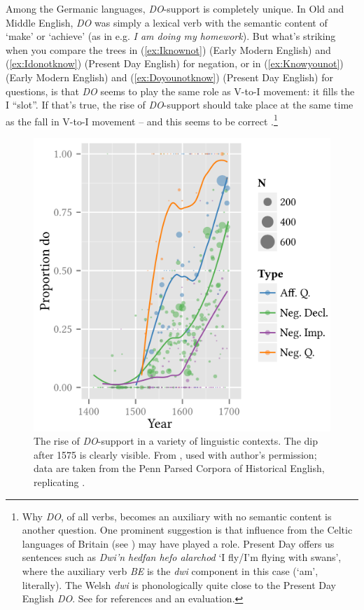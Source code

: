 \noindent Among the Germanic languages, \textit{DO}-support is completely unique. In Old and Middle English, \textit{DO} was simply a lexical verb with the semantic content of `make' or `achieve' (as in e.g. \textit{I am doing my homework}). But what's striking when you compare the trees in (\ref{ex:Iknownot}) (Early Modern English) and (\ref{ex:Idonotknow}) (Present Day English) for negation, or in (\ref{ex:Knowyounot}) (Early Modern English) and (\ref{ex:Doyounotknow}) (Present Day English) for questions, is that \textit{DO} seems to play the same role as V-to-I movement: it fills the I ``slot''. If that's true, the rise of \textit{DO}-support should take place at the same time as the fall in V-to-I movement -- and this seems to be correct \citep{Roberts1985,Roberts1993,Kroch1989}.\footnote{Why \textit{DO}, of all verbs, becomes an auxiliary with no semantic content is another question. One prominent suggestion is that influence from the Celtic languages of Britain (see ) may have played a role. Present Day  offers us sentences such as \textit{Dwi'n hedfan hefo alarchod} `I fly/I'm flying with swans', where the auxiliary verb \textit{BE} is the \textit{dwi} component in this case (`am', literally). The Welsh \textit{dwi} is phonologically quite close to the Present Day English \textit{DO}. See \citet{vanderAuweraGenee2002} for references and an evaluation.}

\begin{figure}
        \includegraphics[width=.75\textwidth]{chapters/img/ecay-do.png}
    \caption{The rise of \emph{DO}-support in a variety of linguistic contexts. The dip after 1575 is clearly visible. From \citet[54]{Ecay2015}, used with author's permission; data are taken from the Penn Parsed Corpora of Historical English, replicating \citet{Ellegard1953}.}
    \label{fig:do}
\end{figure}

